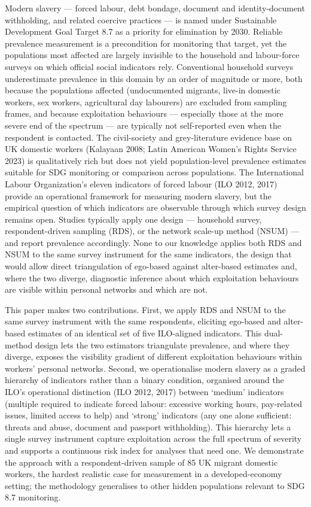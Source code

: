 \documentclass[
  12pt,
  letterpaper,
  DIV=11,
  numbers=noendperiod]{scrartcl}
\begin{document}
Modern slavery --- forced labour, debt bondage, document and
identity-document withholding, and related coercive practices --- is
named under Sustainable Development Goal Target 8.7 as a priority for
elimination by 2030. Reliable prevalence measurement is a precondition
for monitoring that target, yet the populations most affected are
largely invisible to the household and labour-force surveys on which
official social indicators rely. Conventional household surveys
underestimate prevalence in this domain by an order of magnitude or
more, both because the populations affected (undocumented migrants,
live-in domestic workers, sex workers, agricultural day labourers) are
excluded from sampling frames, and because exploitation behaviours ---
especially those at the more severe end of the spectrum --- are
typically not self-reported even when the respondent is contacted. The
civil-society and grey-literature evidence base on UK domestic workers
(Kalayaan 2008; Latin American Women's Rights Service 2023) is
qualitatively rich but does not yield population-level prevalence
estimates suitable for SDG monitoring or comparison across populations.
The International Labour Organization's eleven indicators of forced
labour (ILO 2012, 2017) provide an operational framework for measuring
modern slavery, but the empirical question of which indicators are
observable through which survey design remains open. Studies typically
apply one design --- household survey, respondent-driven sampling (RDS),
or the network scale-up method (NSUM) --- and report prevalence
accordingly. None to our knowledge applies both RDS and NSUM to the same
survey instrument for the same indicators, the design that would allow
direct triangulation of ego-based against alter-based estimates and,
where the two diverge, diagnostic inference about which exploitation
behaviours are visible within personal networks and which are not.

This paper makes two contributions. First, we apply RDS and NSUM to the
same survey instrument with the same respondents, eliciting ego-based
and alter-based estimates of an identical set of five ILO-aligned
indicators. This dual-method design lets the two estimators triangulate
prevalence, and where they diverge, exposes the visibility gradient of
different exploitation behaviours within workers' personal networks.
Second, we operationalise modern slavery as a graded hierarchy of
indicators rather than a binary condition, organised around the ILO's
operational distinction (ILO 2012, 2017) between `medium' indicators
(multiple required to indicate forced labour: excessive working hours,
pay-related issues, limited access to help) and `strong' indicators (any
one alone sufficient: threats and abuse, document and passport
withholding). This hierarchy lets a single survey instrument capture
exploitation across the full spectrum of severity and supports a
continuous risk index for analyses that need one. We demonstrate the
approach with a respondent-driven sample of 85 UK migrant domestic
workers, the hardest realistic case for measurement in a
developed-economy setting; the methodology generalises to other hidden
populations relevant to SDG 8.7 monitoring.
\end{document}
